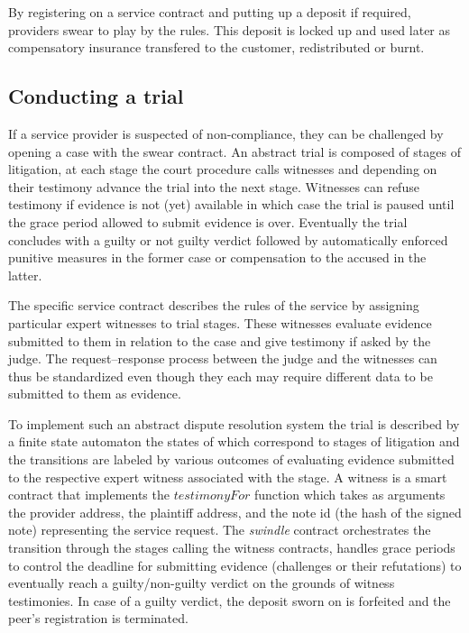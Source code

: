 \documentclass[a4paper,10pt]{article}
\newcommand\gloss[1]{\emph{\gls{#1}}}
\begin{document}
By registering on a service contract and putting up a deposit if required, providers
swear to play by the rules.
This deposit is locked up and used later as compensatory insurance transfered to the
customer, redistributed or burnt.


\subsection{Conducting a trial}

If a service provider is suspected of non-compliance, they can be challenged
by opening a case with the swear contract.
An abstract trial is composed of stages of litigation, at each stage
the court procedure calls witnesses and depending on their testimony
advance the trial into the next stage. Witnesses can refuse testimony
if evidence is not (yet) available in which case the trial
is paused until the grace period allowed to submit evidence is over.
Eventually the trial concludes with a guilty or not guilty verdict followed
by automatically enforced punitive measures in the former case or
compensation to the accused in the latter.

The specific service contract describes the rules of the service
by assigning particular expert witnesses to trial stages. These witnesses
evaluate evidence submitted to them in relation to the case
and give testimony if asked by the judge.
The request--response process between the judge and the witnesses can
thus be standardized
even though they each may require different data to be submitted to them as evidence.

To implement such an abstract dispute resolution system
the trial is described by a finite state automaton the states of which correspond
to stages of litigation and
the transitions are labeled by various outcomes of evaluating evidence submitted
to the respective expert witness associated with the stage. A witness
is a smart contract that implements the $\mathit{testimonyFor}$ function which takes
as arguments the provider address, the plaintiff address, and the note id (the hash of the signed note)
representing the service request.
The \gloss{swindle} contract orchestrates the transition through the stages calling the witness contracts,
handles grace periods to control the deadline for submitting evidence (challenges or their refutations) to
eventually reach a guilty/non-guilty verdict on the grounds of witness testimonies.
In case of a guilty verdict, the deposit sworn on is forfeited and the peer's registration is
terminated.
\end{document}
